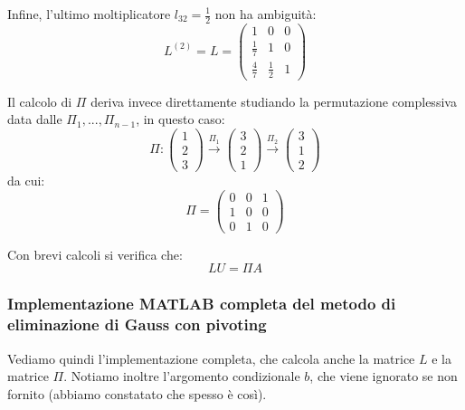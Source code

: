 \documentclass[a4paper,11pt]{article}
\begin{document}
Infine, l'ultimo moltiplicatore $l_{32} = \frac{1}{2}$ non ha ambiguità:
$$
L^{(2)} = L = \begin{pmatrix}
	1 & 0 & 0 \\ 
	\frac{1}{7} & 1 & 0 \\ 
	\frac{4}{7} & \frac{1}{2} & 1
\end{pmatrix}
$$

Il calcolo di $\Pi$ deriva invece direttamente studiando la permutazione complessiva data dalle $\Pi_1, ..., \Pi_{n - 1}$, in questo caso:
$$
\Pi : \begin{pmatrix}
	1 \\ 2 \\ 3
\end{pmatrix}
\xrightarrow{\Pi_1}
\begin{pmatrix}
	3 \\ 2 \\ 1
\end{pmatrix}
\xrightarrow{\Pi_2}
\begin{pmatrix}
	3 \\ 1 \\ 2
\end{pmatrix}
$$
da cui:
$$
\Pi = \begin{pmatrix}
	0 & 0 & 1 \\ 
	1 & 0 & 0 \\ 
	0 & 1 & 0
\end{pmatrix}
$$

Con brevi calcoli si verifica che:
$$
LU = \Pi A
$$

\par\medskip 

\subsubsection{Implementazione MATLAB completa del metodo di eliminazione di Gauss con pivoting}
Vediamo quindi l'implementazione completa, che calcola anche la matrice $L$ e la matrice $\Pi$.
Notiamo inoltre l'argomento condizionale $b$, che viene ignorato se non fornito (abbiamo constatato che spesso è così).

\lstset{style=codestyle, language=matlab}

\end{document}
